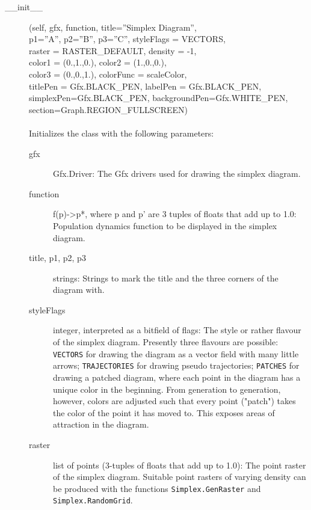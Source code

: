 \documentclass[12pt,a4paper,USenglish]{article}
\begin{document}
\begin{description}

\item[\_\_init\_\_](self, gfx, function, title=''Simplex Diagram'',\\
                 p1=''A'', p2=''B'', p3=''C'', styleFlags = VECTORS,\\
                 raster = RASTER\_DEFAULT, density = -1,\\
                 color1 = (0.,1.,0.), color2 = (1.,0.,0.),\\
                 color3 = (0.,0.,1.), colorFunc = scaleColor,\\
                 titlePen = Gfx.BLACK\_PEN, labelPen = Gfx.BLACK\_PEN,\\
                 simplexPen=Gfx.BLACK\_PEN, backgroundPen=Gfx.WHITE\_PEN,\\
                 section=Graph.REGION\_FULLSCREEN)\\
\\Initializes the class with the following parameters:

\begin{description}

\item[gfx] Gfx.Driver: The Gfx drivers used for drawing the simplex diagram.

\item[function] f(p)->p*, where p and p' are 3 tuples of floats
        that add up to 1.0: Population dynamics function to be displayed
	in the simplex diagram.

\item[title, p1, p2, p3] strings: Strings to mark the title and the
        three corners of the diagram with.

\item[styleFlags] integer, interpreted as a bitfield of flags:
            The style or rather flavour of the simplex diagram.
            Presently three flavours are possible: {\tt VECTORS} for drawing
            the diagram as a vector field with many little arrows;
            {\tt TRAJECTORIES} for drawing pseudo trajectories; 
	    {\tt PATCHES} for drawing a patched diagram, where each 
	    point in the diagram has a unique color in the beginning. 
            From generation to generation, however, colors are adjusted 
	    such that every point ("patch") takes the color of the point it
            has moved to. This exposes areas of attraction in the
            diagram.

\item[raster] list of points (3-tuples of floats that add up to 1.0):
	The point raster of the simplex diagram. Suitable point rasters of
	varying density can be produced with the functions 
	{\tt Simplex.GenRaster} and {\tt Simplex.RandomGrid}.


\end{description}
\end{description}
\end{document}
